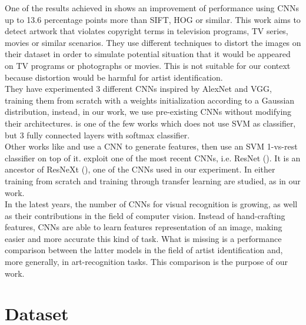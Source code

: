 \documentclass{article}
\begin{document}
One of the results achieved in \cite{hong2017} shows an improvement of performance using CNNs up to 13.6 percentage points more than SIFT, HOG or similar.  This work aims to detect artwork that violates copyright terms in television programs, TV series, movies or similar scenarios. They use different techniques to distort the images on their dataset in order to simulate potential situation that it would be appeared on TV programs or photographs or
movies. This is not suitable for our context because distortion would be harmful for artist identification.\\
They have experimented 3 different CNNs inspired by AlexNet and VGG, training them from scratch with a weights initialization according to a Gaussian distribution, instead, in our work, we use pre-existing CNNs without modifying their architectures. \cite{hong2017} is one of the few works which does not use SVM as classifier, but 3 fully connected layers with softmax classifier.\\
Other works like \cite{Bar2014} and \cite{razavian2014} use a CNN to generate features, then use an SVM 1-vs-rest classifier on top of it.
\cite{ArtistIdCNN406} exploit one of the most recent CNNs, i.e. ResNet (\cite{resnet}). It is an ancestor of ResNeXt (\cite{resneXt}), one of the CNNs used in our experiment. In \cite{ArtistIdCNN406} either training from scratch and training through transfer learning are studied,  as in our work.
\\

In the latest years, the number of CNNs for visual recognition is growing, as well as their contributions in the field of computer vision. Instead of hand-crafting features, CNNs are able to learn features representation of an image, making easier and more accurate this kind of task. What is missing is a performance comparison between the latter models in the field of artist identification and, more generally, in art-recognition tasks. This comparison is the purpose of our work.


\section{Dataset}\label{dataset}
\end{document}
